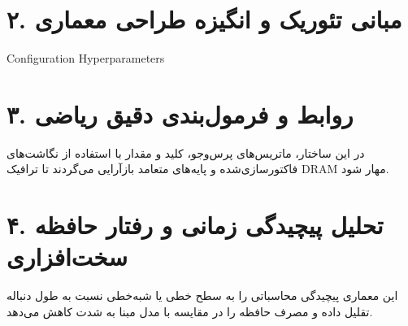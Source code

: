 \documentclass[12pt,a4paper]{article}
\begin{document}
\section*{۲. مبانی تئوریک و انگیزه طراحی معماری}
Configuration Hyperparameters

\section*{۳. روابط و فرمول‌بندی دقیق ریاضی}
در این ساختار، ماتریس‌های پرس‌وجو، کلید و مقدار با استفاده از نگاشت‌های فاکتورسازی‌شده و پایه‌های متعامد بازآرایی می‌گردند تا ترافیک DRAM مهار شود.

\section*{۴. تحلیل پیچیدگی زمانی و رفتار حافظه سخت‌افزاری}
این معماری پیچیدگی محاسباتی را به سطح خطی یا شبه‌خطی نسبت به طول دنباله تقلیل داده و مصرف حافظه را در مقایسه با مدل مبنا به شدت کاهش می‌دهد.
\end{document}

